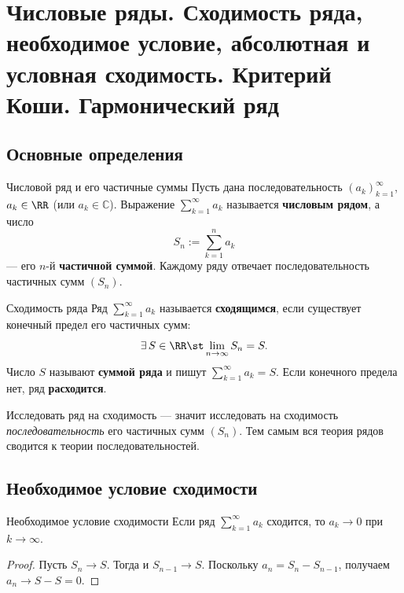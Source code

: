 
\section{Числовые ряды. Сходимость ряда, необходимое условие, абсолютная и условная сходимость. Критерий Коши. Гармонический ряд}

\subsection*{Основные определения}

\begin{Definition}{Числовой ряд и его частичные суммы}{}
	Пусть дана последовательность $(a_k)_{k=1}^{\infty}$, $a_k\in\RR$ (или
	$a_k\in\mathbb{C}$). Выражение $\sum_{k=1}^{\infty} a_k$ называется
	\textbf{числовым рядом}, а число
	\[
	S_n:=\sum_{k=1}^{n} a_k
	\]
	--- его $n$-й \textbf{частичной суммой}. Каждому ряду отвечает
	последовательность частичных сумм $(S_n)$.
\end{Definition}

\begin{Definition}{Сходимость ряда}{}
	Ряд $\sum_{k=1}^{\infty} a_k$ называется \textbf{сходящимся}, если
	существует конечный предел его частичных сумм:
	\[
	\exists\,S\in\RR\st \lim_{n\to\infty} S_n=S.
	\]
	Число $S$ называют \textbf{суммой ряда} и пишут $\sum_{k=1}^{\infty}a_k=S$.
	Если конечного предела нет, ряд \textbf{расходится}.
\end{Definition}

\begin{Remark}{}{}
	Исследовать ряд на сходимость --- значит исследовать на сходимость
	\emph{последовательность} его частичных сумм $(S_n)$. Тем самым вся теория
	рядов сводится к теории последовательностей.
\end{Remark}

\subsection*{Необходимое условие сходимости}

\begin{Proposition}{Необходимое условие сходимости}{}
	Если ряд $\sum_{k=1}^{\infty} a_k$ сходится, то $a_k\to0$ при $k\to\infty$.
\end{Proposition}

\begin{proof}
	Пусть $S_n\to S$. Тогда и $S_{n-1}\to S$. Поскольку
	$a_n=S_n-S_{n-1}$, получаем $a_n\to S-S=0$.
\end{proof}

